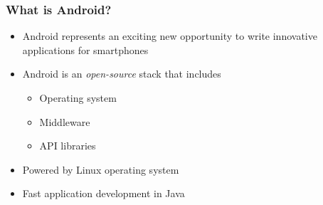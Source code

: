 %
%

\begin{frame}
  \frametitle{What is Android?}
  
  \begin{itemize}
    
  \item<1-> Android represents an exciting new opportunity to write
    innovative applications for smartphones
  \item<2-> Android is an \emph{open-source} stack that includes
    \begin{itemize}
    \item<3-> Operating system
    \item<3-> Middleware
    \item<3-> API libraries
    \end{itemize}
    
  \item<3-> Powered by Linux operating system

  \item<4-> Fast application development in Java

  \end{itemize}

\end{frame}



